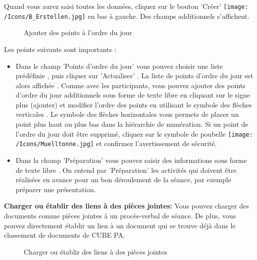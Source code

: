 Quand vous aurez saisi toutes les données, cliquez sur le bouton 'Créer' \texttt{[image: /Icons/B\_Erstellen.jpg]} en bas à gauche. Des champs additionnels s'affichent.

\begin{figure}[H]
\caption{Ajouter des points à l'ordre du jour}
\end{figure}

Les points suivants sont importants :

\begin{itemize}
\item 
Dans le champ 'Points d'ordre du jour' vous pouvez choisir une liste prédéfinie , puis cliquer sur 'Actualiser' . La liste de points d'ordre du jour est alors affichée . Comme avec les participants, vous pouvez ajouter des points d'ordre du jour additionnels sous forme de texte libre en cliquant sur le signe plus (ajouter)  et modifier l'ordre des points en utilisant le symbole des flèches verticales . Le symbole des flèches horizontales  vous permets de placer un point plus haut ou plus bas dans la hiérarchie de numération. Si un point de l'ordre du jour doit être supprimé, cliquez sur le symbole de poubelle \texttt{[image: /Icons/Muelltonne.jpg]}  et confirmez l'avertissement de sécurité.
\item 
Dans la champ 'Préparation' vous pouvez saisir des informations sous forme de texte libre . On entend par 'Préparation' les activités qui doivent être réalisées en avance pour un bon déroulement de la séance, par exemple préparer une présentation.
\end{itemize}

\textbf{Charger ou établir des liens à des pièces jointes:}
Vous pouvez charger des documents comme pièces jointes à un procès-verbal de séance. De plus, vous pouvez directement établir un lien à un document qui se trouve déjà dans le classement de documents de CUBE PA.  

\vspace{\baselineskip}

\begin{figure}[H]
\caption{Charger ou établir des liens à des pièces jointes}
\end{figure}


